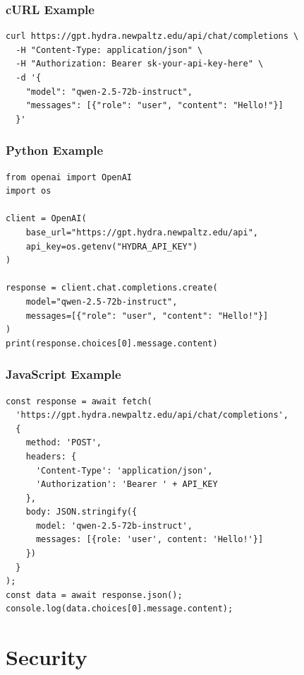 \documentclass[11pt,a4paper]{article}
\begin{document}
\section{cURL Example}

\begin{lstlisting}[style=bash]
curl https://gpt.hydra.newpaltz.edu/api/chat/completions \
  -H "Content-Type: application/json" \
  -H "Authorization: Bearer sk-your-api-key-here" \
  -d '{
    "model": "qwen-2.5-72b-instruct",
    "messages": [{"role": "user", "content": "Hello!"}]
  }'
\end{lstlisting}

\section{Python Example}

\begin{lstlisting}[style=js]
from openai import OpenAI
import os

client = OpenAI(
    base_url="https://gpt.hydra.newpaltz.edu/api",
    api_key=os.getenv("HYDRA_API_KEY")
)

response = client.chat.completions.create(
    model="qwen-2.5-72b-instruct",
    messages=[{"role": "user", "content": "Hello!"}]
)
print(response.choices[0].message.content)
\end{lstlisting}

\section{JavaScript Example}

\begin{lstlisting}[style=js]
const response = await fetch(
  'https://gpt.hydra.newpaltz.edu/api/chat/completions',
  {
    method: 'POST',
    headers: {
      'Content-Type': 'application/json',
      'Authorization': 'Bearer ' + API_KEY
    },
    body: JSON.stringify({
      model: 'qwen-2.5-72b-instruct',
      messages: [{role: 'user', content: 'Hello!'}]
    })
  }
);
const data = await response.json();
console.log(data.choices[0].message.content);
\end{lstlisting}

\newpage
\part{Security}
\end{document}
